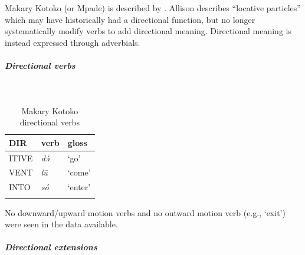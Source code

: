 Makary Kotoko (or Mpade) is described by \citet{allisonAspectsGrammarMakary2012,allisonGrammarMakaryKotoko2020}. Allison describes ``locative particles'' which may have historically had a directional function, but no longer systematically modify verbs to add directional meaning. Directional meaning is instead expressed through adverbials. %

\newpage
\subparagraph{Directional verbs}~

\begin{table}[H]
	\caption{Makary Kotoko directional verbs} 
	\label{tab:makaV}
	\begin{tabular}{lll} %
		\lsptoprule
		DIR & verb & gloss   \\ %
		\midrule
		ITIVE & \textit{də́} & `go' \\
		VENT & \textit{lū} & `come' \\
		INTO& \textit{só} & `enter' \\
		\lspbottomrule
	\end{tabular}
\end{table}

No downward/upward motion verbs and no outward motion verb (e.g., `exit') were seen in the data available. 

\subparagraph{Directional extensions}~



